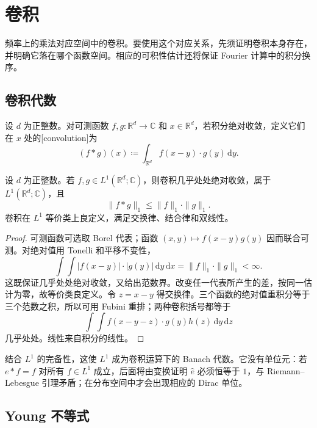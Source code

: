 \section{卷积}
\label{b2:sec:0303}

频率上的乘法对应空间中的卷积。要使用这个对应关系，先须证明卷积本身存在，并明确它落在哪个函数空间。相应的可积性估计还将保证 Fourier 计算中的积分换序。

\subsection{卷积代数}
\label{b2:subsec:030301}

\begin{definition}\label{b2:def:03-convolution}
设 \(d\) 为正整数。对可测函数 \(f,g:\mathbb R^d\to\mathbb C\) 和 \(x\in\mathbb R^d\)，若积分绝对收敛，定义它们在 \(x\) 处的[convolution]为
\[
 (f*g)(x)\coloneqq\int_{\mathbb R^d}f(x-y)\cdot g(y)\,\mathrm{d}y.
\]
\end{definition}

\begin{proposition}\label{b2:prop:03-l1-algebra}
设 \(d\) 为正整数。若 \(f,g\in L^1(\mathbb R^d;\mathbb C)\)，则卷积几乎处处绝对收敛，属于 \(L^1(\mathbb R^d;\mathbb C)\)，且
\[
 \|f*g\|_1\leq\|f\|_1\cdot\|g\|_1.
\]
卷积在 \(L^1\) 等价类上良定义，满足交换律、结合律和双线性。
\end{proposition}
\begin{proof}
可测函数可选取 Borel 代表；函数 \((x,y)\mapsto f(x-y)g(y)\) 因而联合可测。对绝对值用 Tonelli 和平移不变性，
\[
 \int\!\int|f(x-y)|\cdot|g(y)|\,\mathrm{d}y\,\mathrm{d}x
 =\|f\|_1\cdot\|g\|_1<\infty.
\]
这既保证几乎处处绝对收敛，又给出范数界。改变任一代表所产生的差，按同一估计为零，故等价类良定义。令 \(z=x-y\) 得交换律。三个函数的绝对值重积分等于三个范数之积，所以可用 Fubini 重排；两种卷积括号都等于
\[
 \int\!\int f(x-y-z)\cdot g(y)h(z)\,\mathrm{d}y\,\mathrm{d}z
\]
几乎处处。线性来自积分的线性。
\end{proof}

结合 \(L^1\) 的完备性，这使 \(L^1\) 成为卷积运算下的 Banach 代数。它没有单位元：若 \(e*f=f\) 对所有 \(f\in L^1\) 成立，后面将由变换证明 \(\widehat e\) 必须恒等于 \(1\)，与 Riemann--Lebesgue 引理矛盾；在分布空间中才会出现相应的 Dirac 单位。

\subsection{Young 不等式}
\label{b2:subsec:030302}

